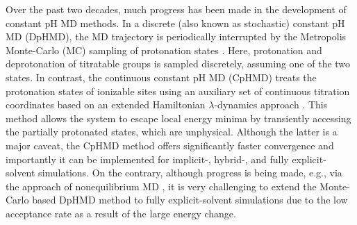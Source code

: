 Over the past two decades, much progress has been made in the
development of constant pH MD methods.
In a discrete (also known as stochastic) constant pH MD (DpHMD), the MD trajectory is periodically
interrupted by the Metropolis Monte-Carlo (MC) sampling of 
protonation states \cite{Baptista_Soares_2002_J.Chem.Phys.,Mongan_McCammon_2004_J.Comput.Chem.,Swails_Roitberg_2014_J.Chem.TheoryComput.,Stern_Stern_2007_J.Chem.Phys.,Chen_Roux_2015_J.Chem.TheoryComput.}. 
Here, protonation and deprotonation of titratable groups is
sampled discretely, assuming one of the two states. 
In contrast, the continuous constant pH MD (CpHMD) 
\cite{Lee_Brooks_2004_Proteins,Khandogin_Brooks_2005_Biophys.J.,Khandogin_Brooks_2006_Biochemistry,Wallace_Shen_2011_J.Chem.TheoryComput.,Wallace_Shen_2012_J.Chem.Phys.,Huang_Shen_2016_J.Chem.TheoryComput.}
treats the protonation states of ionizable sites using an auxiliary set of continuous titration coordinates based on an extended Hamiltonian $\lambda$-dynamics approach \cite{Kong_Brooks_1996_J.Chem.Phys.}. 
This method allows the system to escape local energy minima by transiently accessing the partially protonated states, which are unphysical.
Although the latter is a major caveat, the CpHMD method offers significantly faster convergence and importantly it can be implemented for implicit-, hybrid-, and fully explicit-solvent simulations.
On the contrary, although progress is being made, 
e.g., via the approach of nonequilibrium MD \cite{Stern_Stern_2007_J.Chem.Phys.,Chen_Roux_2015_J.Chem.TheoryComput.,Radak_Roux_2017_J.Chem.TheoryComput.}, 
it is very challenging to extend the Monte-Carlo based DpHMD method to fully explicit-solvent simulations
due to the low acceptance rate as a result of the 
large energy change.

